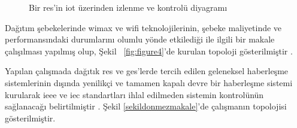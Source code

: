 \begin{figure}[htbp]



\caption{Bir \gls{res}'in \gls{iot} üzerinden izlenme ve kontrolü diyagramı}
\label{fig:figure3}
\end{figure}


Dağıtım şebekelerinde \gls{wimax} ve \gls{wifi} teknolojilerinin, şebeke maliyetinde ve performansındaki durumlarını olumlu yönde etkilediği ile ilgili bir makale çalışılması yapılmış olup, Şekil ~\ref{fig:figure4}'de kurulan topoloji gösterilmiştir \cite{wlanwimaxprem}.

Yapılan çalışmada dağıtık \gls{res} ve \gls{ges}'lerde tercih edilen geleneksel haberleşme sistemlerinin dışında yenilikçi ve tamamen kapalı devre bir haberleşme sistemi kurularak \gls{ieee} ve \gls{iec} standartları ihlal edilmeden sistemin kontrolünün sağlanacağı belirtilmiştir \cite{donmezdesign}. Şekil \ref{sekildonmezmakale}'de çalışmanın topolojisi gösterilmiştir.


